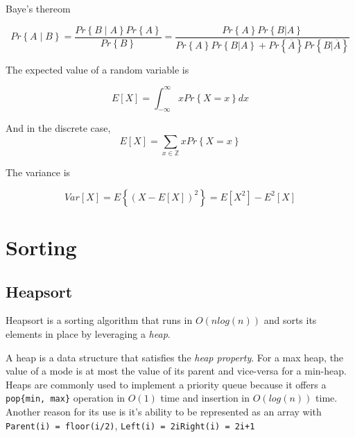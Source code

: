 \documentclass[../notes.tex]{subfiles}
\begin{document}
\begin{definition}
	Baye's thereom


	\begin{equation}
		Pr \left\{ A \mid B \right\} = \frac{Pr \left\{ B \mid A \right\} Pr \left\{ A \right\}}{Pr \left\{ B \right\}}
		= \frac{Pr \left\{ A \right\} Pr \left\{ B | A \right\} }{Pr \left\{ A \right\} Pr \left\{ B | A \right\} + Pr \left\{ \overline{A} \right\} Pr \left\{ B | \overline{A} \right\} }
	\end{equation}
	
\end{definition}


The expected value of a random variable is 

\begin{equation}
	E[X] = \int_{-\infty}^{\infty} x Pr \left\{ X = x \right\} dx
\end{equation}

And in the discrete case,
\begin{equation}
	E[X] = \sum_{x \in \mathbb{Z}} x Pr \left\{ X = x \right\}
\end{equation}


The variance is 

\begin{equation}
	Var[X] = E \left\{ \left( X - E[X] \right)^2 \right\} = E[X^2] - E^2[X]
\end{equation}





\section{Sorting}

\subsection{Heapsort}

Heapsort is a sorting algorithm that runs in $ O(nlog(n)) $ and sorts its elements in place by leveraging a \textit{heap}.

\begin{definition}
A heap is a data structure that satisfies the \textit{heap property}. For a max heap, the value of a mode is at most the value of its parent and vice-versa for a min-heap. Heaps are commonly used to implement a priority queue because it offers a \texttt{pop\{min, max\}} operation in $ O(1) $ time and insertion in $ O(log(n)) $ time. Another reason for its use is it's ability to be represented as an array with \texttt{Parent(i) = floor(i/2)}, \texttt{Left(i) = 2i}\texttt{Right(i) = 2i+1} 

\end{definition}
\end{document}
